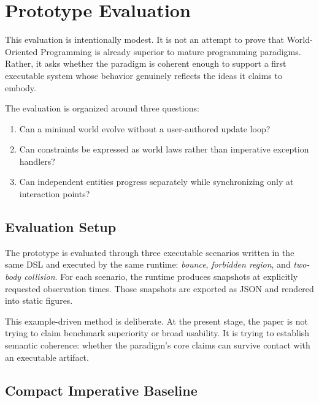 \section{Prototype Evaluation}

This evaluation is intentionally modest.
It is not an attempt to prove that World-Oriented Programming is already superior to mature programming paradigms.
Rather, it asks whether the paradigm is coherent enough to support a first executable system whose behavior genuinely reflects the ideas it claims to embody.

The evaluation is organized around three questions:
\begin{enumerate}
\item Can a minimal world evolve without a user-authored update loop?
\item Can constraints be expressed as world laws rather than imperative exception handlers?
\item Can independent entities progress separately while synchronizing only at interaction points?
\end{enumerate}

\subsection{Evaluation Setup}

The prototype is evaluated through three executable scenarios written in the same DSL and executed by the same runtime:
\emph{bounce}, \emph{forbidden region}, and \emph{two-body collision}.
For each scenario, the runtime produces snapshots at explicitly requested observation times.
Those snapshots are exported as JSON and rendered into static figures.

This example-driven method is deliberate.
At the present stage, the paper is not trying to claim benchmark superiority or broad usability.
It is trying to establish semantic coherence: whether the paradigm's core claims can survive contact with an executable artifact.

\subsection{Compact Imperative Baseline}


